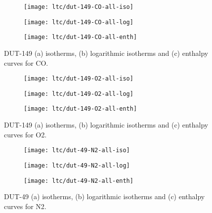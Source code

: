 \begin{figure}[htb]
    \centering
    \begin{subfigure}{0.33\linewidth}
        \texttt{[image: ltc/dut-149-CO-all-iso]}%
        \caption{}
    \end{subfigure}%
    \begin{subfigure}{0.33\linewidth}
        \texttt{[image: ltc/dut-149-CO-all-log]}%
        \caption{}
    \end{subfigure}%
    \begin{subfigure}{0.33\linewidth}
        \texttt{[image: ltc/dut-149-CO-all-enth]}%
        \caption{}
    \end{subfigure}%
    \caption{DUT-149 (a) isotherms, (b) logarithmic isotherms and 
    (c) enthalpy curves for CO.}%
    \label{appx:dut:fgr:dut-149-CO-ltc}
\end{figure}

\begin{figure}[htb]
    \centering
    \begin{subfigure}{0.33\linewidth}
        \texttt{[image: ltc/dut-149-O2-all-iso]}%
        \caption{}
    \end{subfigure}%
    \begin{subfigure}{0.33\linewidth}
        \texttt{[image: ltc/dut-149-O2-all-log]}%
        \caption{}
    \end{subfigure}%
    \begin{subfigure}{0.33\linewidth}
        \texttt{[image: ltc/dut-149-O2-all-enth]}%
        \caption{}
    \end{subfigure}%
    \caption{DUT-149 (a) isotherms, (b) logarithmic isotherms and 
    (c) enthalpy curves for O2.}%
    \label{appx:dut:fgr:dut-149-O2-ltc}
\end{figure}

\begin{figure}[htb]
    \centering
    \begin{subfigure}{0.33\linewidth}
        \texttt{[image: ltc/dut-49-N2-all-iso]}%
        \caption{}
    \end{subfigure}%
    \begin{subfigure}{0.33\linewidth}
        \texttt{[image: ltc/dut-49-N2-all-log]}%
        \caption{}
    \end{subfigure}%
    \begin{subfigure}{0.33\linewidth}
        \texttt{[image: ltc/dut-49-N2-all-enth]}%
        \caption{}
    \end{subfigure}%
    \caption{DUT-49 (a) isotherms, (b) logarithmic isotherms and 
    (c) enthalpy curves for N2.}%
    \label{appx:dut:fgr:dut-49-N2-ltc}
\end{figure}

